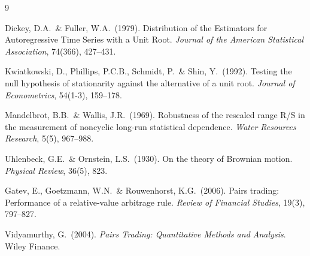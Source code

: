 \documentclass[12pt,a4paper]{article}
\begin{document}
\begin{thebibliography}{9}

Dickey, D.A.\ \& Fuller, W.A.\ (1979).
Distribution of the Estimators for Autoregressive Time Series
with a Unit Root.
\textit{Journal of the American Statistical Association}, 74(366), 427--431.

Kwiatkowski, D., Phillips, P.C.B., Schmidt, P.\ \& Shin, Y.\ (1992).
Testing the null hypothesis of stationarity against the alternative
of a unit root.
\textit{Journal of Econometrics}, 54(1-3), 159--178.

Mandelbrot, B.B.\ \& Wallis, J.R.\ (1969).
Robustness of the rescaled range R/S in the measurement of noncyclic
long-run statistical dependence.
\textit{Water Resources Research}, 5(5), 967--988.

Uhlenbeck, G.E.\ \& Ornstein, L.S.\ (1930).
On the theory of Brownian motion.
\textit{Physical Review}, 36(5), 823.

Gatev, E., Goetzmann, W.N.\ \& Rouwenhorst, K.G.\ (2006).
Pairs trading: Performance of a relative-value arbitrage rule.
\textit{Review of Financial Studies}, 19(3), 797--827.

Vidyamurthy, G.\ (2004).
\textit{Pairs Trading: Quantitative Methods and Analysis}.
Wiley Finance.

\end{thebibliography}
\end{document}

